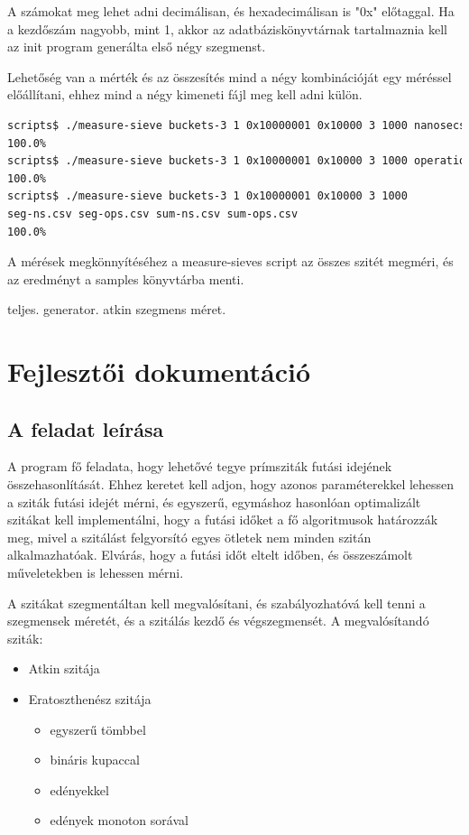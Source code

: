 \documentclass[12pt]{report}
\begin{document}
A számokat meg lehet adni decimálisan, és hexadecimálisan is "0x" előtaggal.
Ha a kezdőszám nagyobb, mint 1, akkor az adatbáziskönyvtárnak tartalmaznia
kell az init program generálta első négy szegmenst.

Lehetőség van a mérték és az összesítés mind a négy kombinációját egy
méréssel előállítani, ehhez mind a négy kimeneti fájl meg kell adni külön.

{\tiny
\begin{lstlisting}[language=bash]
scripts$ ./measure-sieve buckets-3 1 0x10000001 0x10000 3 1000 nanosecs sum out1.csv
100.0%
scripts$ ./measure-sieve buckets-3 1 0x10000001 0x10000 3 1000 operations segment out2.csv
100.0%
scripts$ ./measure-sieve buckets-3 1 0x10000001 0x10000 3 1000
seg-ns.csv seg-ops.csv sum-ns.csv sum-ops.csv
100.0%
\end{lstlisting}
}

A mérések megkönnyítéséhez a measure-sieves script az összes szitét megméri,
és az eredményt a samples könyvtárba menti.

{\color{red}teljes. generator. atkin szegmens méret.}

\chapter{Fejlesztői dokumentáció}

\section{A feladat leírása}

A program fő feladata, hogy lehetővé tegye prímsziták futási idejének összehasonlítását.
Ehhez keretet kell adjon, hogy azonos paraméterekkel lehessen a sziták futási idejét mérni,
és egyszerű, egymáshoz hasonlóan optimalizált szitákat kell implementálni,
hogy a futási időket a fő algoritmusok határozzák meg, mivel a szitálást felgyorsító
egyes ötletek nem minden szitán alkalmazhatóak.
Elvárás, hogy a futási időt eltelt időben, és összeszámolt műveletekben is lehessen mérni.

A szitákat szegmentáltan kell megvalósítani, és szabályozhatóvá kell tenni
a szegmensek méretét, és a szitálás kezdő és végszegmensét. A megvalósítandó sziták:
\begin{itemize}
\item Atkin szitája
\item Eratoszthenész szitája
\begin{itemize}
\item egyszerű tömbbel
\item bináris kupaccal
\item edényekkel
\item edények monoton sorával
\end{itemize}
\end{itemize}
\end{document}

